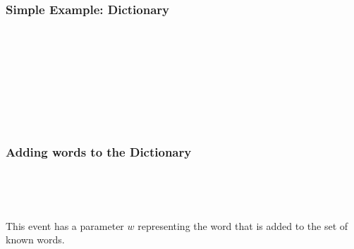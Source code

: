 \documentclass{beamer}
\begin{document}
\begin{frame}


\frametitle{Simple Example: Dictionary }

\ENDC\\

~

~


~


~



\end{frame}




\begin{frame}

\frametitle{Adding  words to the Dictionary }

\operations
{}

~

~

This event has a \alert{parameter} $w$ representing the word that is added to the set of known words.

\end{frame}
\end{document}
